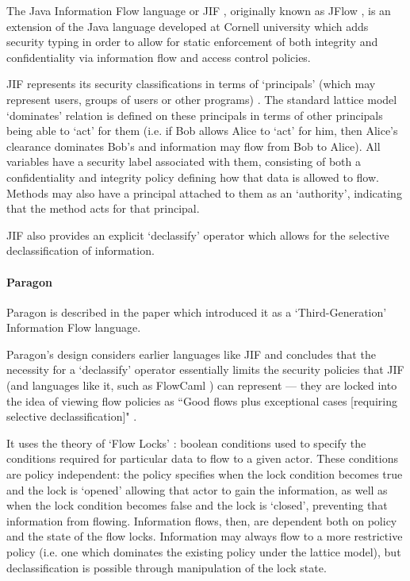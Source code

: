The Java Information Flow language or JIF \cite{myers2006jif}, originally known as JFlow \cite{myers1999jif}, is an extension of the Java language developed at Cornell university which adds security typing in order to allow for static enforcement of both integrity and confidentiality via information flow and access control policies.

JIF represents its security classifications in terms of `principals' (which may represent users, groups of users or other programs) \cite{pullicino2014jif}. The standard lattice model `dominates' relation is defined on these principals in terms of other principals being able to `act' for them (i.e. if Bob allows Alice to `act' for him, then Alice's clearance dominates Bob's and information may flow from Bob to Alice). All variables have a security label associated with them, consisting of both a confidentiality and integrity policy defining how that data is allowed to flow. Methods may also have a principal attached to them as an `authority', indicating that the method acts for that principal.

JIF also provides an explicit `declassify' operator which allows for the selective declassification of information.

\paragraph{Paragon}

Paragon is described in the paper which introduced it \cite{broberg2013paragon} as a `Third-Generation' Information Flow language.

Paragon's design considers earlier languages like JIF and concludes that the necessity for a `declassify' operator essentially limits the security policies that JIF (and languages like it, such as FlowCaml \cite{simonet2003flow}) can represent --- they are locked into the idea of viewing flow policies as ``Good flows plus exceptional cases [requiring selective declassification]" \cite{broberg2013paragon}.

It uses the theory of `Flow Locks' \cite{broberg2010paralocks}: boolean conditions used to specify the conditions required for particular data to flow to a given actor. These conditions are policy independent: the policy specifies when the lock condition becomes true and the lock is `opened' allowing that actor to gain the information, as well as when the lock condition becomes false and the lock is `closed', preventing that information from flowing. Information flows, then, are dependent both on policy and the state of the flow locks. Information may always flow to a more restrictive policy (i.e. one which dominates the existing policy under the lattice model), but declassification is possible through manipulation of the lock state.

